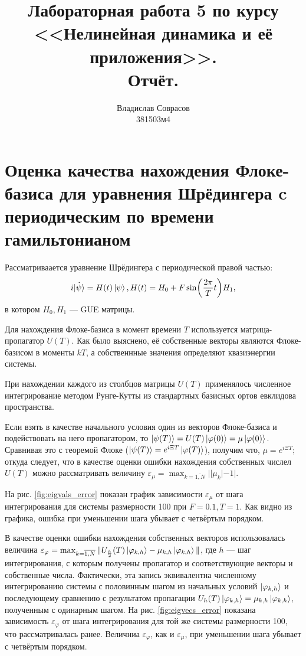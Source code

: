 \documentclass[a4paper]{article}
\begin{document}
\title{Лабораторная работа 5 по курсу <<Нелинейная динамика и её приложения>>. \\Отчёт.}
\author{Владислав Соврасов\\ 381503м4}
\date{}
\maketitle

\section{Оценка качества нахождения Флоке-базиса для уравнения Шрёдингера c
периодическим по времени гамильтонианом}
Рассматриваается уравнение Шрёдингера с периодической правой частью:
\begin{displaymath}
	i \dot{\ket \psi} = H(t)\ket \psi, H(t)=H_0 + F \sin(\frac{2\pi}{T} t)H_1,
\end{displaymath}
в котором \(H_0, H_1\) --- GUE матрицы.

Для нахождения Флоке-базиса в момент времени \(T\) используется матрица-пропагатор \(U(T)\).
Как было выяснено, её собственные векторы являются Флоке-базисом в моменты \(kT\),
а собственнные значения определяют квазиэнергии системы.

При нахождении каждого из столбцов матрицы \(U(T)\) применялось численное интегрирование
методом Рунге-Кутты из стандартных базисных ортов евклидова пространства.

Если взять в качестве начального условия один из векторов Флоке-базиса и подействовать на
него пропагатором, то \(\ket{\psi(T)}=U(T)\ket{\varphi(0)}=\mu\ket{\varphi(0)}\). Сравнивая это с
теоремой Флоке (\(\ket{\psi(T)}=e^{i\Xi T}\ket{\varphi(T)}\)), получим что, \(\mu=e^{i\Xi T}\); откуда следует, что
в качестве оценки ошибки нахождения собственных числел \(U(T)\) можно рассматривать величину
\(\varepsilon_\mu = \max_{k=\overline{1,N}}||\mu_k|-1|\).

На рис. \ref{fig:eigvals_error} показан график зависимости \(\varepsilon_\mu\) от
шага интегрирования для системы размерности 100 при \(F=0.1,T=1\). Как видно из графика, ошибка при
уменьшении шага убывает с четвёртым порядком.

В качестве оценки ошибки нахождения собственных векторов использовалась величина
\(\varepsilon_\varphi=\max_{k=\overline{1,N}}\Vert U_{\frac{h}{2}}(T)\ket{\varphi_{k,h}} -\mu_{k,h}\ket{\varphi_{k,h}}\Vert\),
где \(h\) --- шаг интегрирования, с которым получены пропагатор и соответствующие векторы и собственные числа.
Фактически, эта запись эквивалентна численному интегрированию системы с половинным шагом
из начальных условий \(\ket{\varphi_{k,h}}\) и последующему сравнению с результатом
пропагации \(U_h(T)\ket{\varphi_{k,h}}=\mu_{k,h}\ket{\varphi_{k,h}}\), полученным с одинарным шагом. На рис. \ref{fig:eigvecs_error}
показана зависимость \(\varepsilon_\varphi\) от шага интегрирования для той же системы размерности
100, что рассматривалась ранее. Величниа \(\varepsilon_\varphi\), как и \(\varepsilon_\mu\),
при уменьшении шага убывает с четвёртым порядком.
\end{document}
